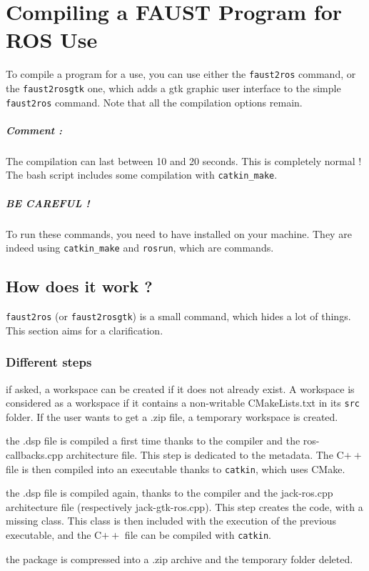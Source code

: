 \chapter{Compiling a FAUST Program for ROS Use}
\label{chap:compilation}

To compile a \faust program for a \ros use, you can use either the \lstinline'faust2ros' command, or the \lstinline'faust2rosgtk' one, which adds a gtk graphic user interface to the simple \lstinline'faust2ros' command.
Note that all the \faust compilation options remain.
\paragraph{Comment :}The compilation can last between 10 and 20 seconds. This is completely normal ! The bash script includes some \ros compilation with \lstinline'catkin_make'.

\paragraph{\color{yoheader}BE CAREFUL !}To run these commands, you need to have \ros installed on your machine. They are indeed using \lstinline'catkin_make' and \lstinline'rosrun', which are \ros commands.

\section{How does it work ?}
\lstinline'faust2ros' (or \lstinline'faust2rosgtk') is a small command, which hides a lot of things. This section aims for a clarification.
\subsection{Different steps}
\label{subsec:steps}
\begin{description}[%
  before={\setcounter{descriptcount}{0}},%
  ,font=\bfseries\stepcounter{descriptcount}Step \arabic{descriptcount}.~]
\item [Workspace Creation :] if asked, a workspace can be created if it does not already exist. A workspace is considered as a \ros workspace if it contains a non-writable CMakeLists.txt in its \lstinline'src' folder. If the user wants to get a .zip file, a temporary workspace is created.
\item [First compilation :] the .dsp file is compiled a first time thanks to the \faust compiler and the ros-callbacks.cpp architecture file. This step is dedicated to the \ros metadata. The C$++$ file is then compiled into an executable thanks to \lstinline'catkin', which uses CMake.
\item [Second compilation :]the .dsp file is compiled again, thanks to the \faust compiler and the jack-ros.cpp architecture file (respectively jack-gtk-ros.cpp). This step creates the \ros code, with a missing class. This class is then included with the execution of the previous executable, and the C$++$ file can be compiled with \lstinline'catkin'.
\item[Cleaning :] the package is compressed into a .zip archive and the temporary folder deleted.
\end{description}

